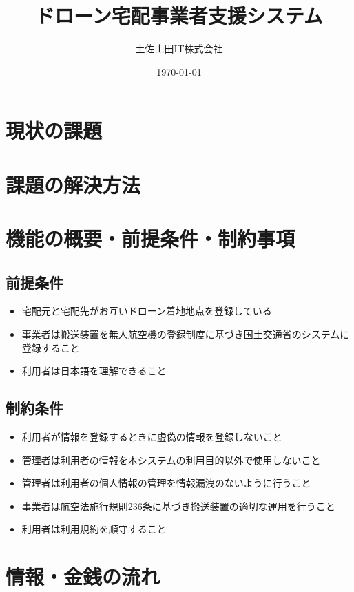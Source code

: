 \documentclass[a4paper, titlepage]{jsarticle}
\date{\today}
\title{ドローン宅配事業者支援システム}
\author{土佐山田IT株式会社}
\begin{document}
\maketitle

\tableofcontents

\clearpage

\section{現状の課題}

\section{課題の解決方法}

\section{機能の概要・前提条件・制約事項}

\subsection{前提条件}
\begin{itemize}
	\item 宅配元と宅配先がお互いドローン着地地点を登録している
	\item 事業者は搬送装置を無人航空機の登録制度に基づき国土交通省のシステムに登録すること
	\item 利用者は日本語を理解できること
\end{itemize}
\subsection{制約条件}
\begin{itemize}
	\item 利用者が情報を登録するときに虚偽の情報を登録しないこと
	\item 管理者は利用者の情報を本システムの利用目的以外で使用しないこと
	\item 管理者は利用者の個人情報の管理を情報漏洩のないように行うこと
	\item 事業者は航空法施行規則236条に基づき搬送装置の適切な運用を行うこと
	\item 利用者は利用規約を順守すること
\end{itemize}
\section{情報・金銭の流れ}
\end{document}
